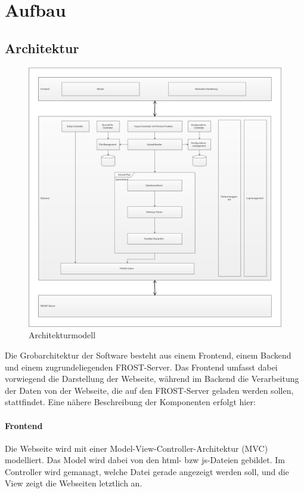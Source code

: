 \section{Aufbau}

\subsection{Architektur}
\begin{figure}[htbp]
\centering
\includegraphics[scale=0.44]{uml/architektur.eps}
\caption{\label{fig:architektur} Architekturmodell}
\end{figure}

Die Grobarchitektur der Software besteht aus einem Frontend, einem Backend und einem zugrundeliegenden FROST-Server. Das Frontend umfasst dabei vorwiegend die Darstellung der Webseite, während im Backend die Verarbeitung der Daten von der Webseite, die auf den FROST-Server geladen werden sollen, stattfindet. Eine nähere Beschreibung der Komponenten erfolgt hier:

\paragraph{Frontend}
Die Webseite wird mit einer Model-View-Controller-Architektur (MVC) modelliert.
Das Model wird dabei von den html- bzw js-Dateien gebildet.
Im Controller wird gemanagt, welche Datei gerade angezeigt werden soll, und die View zeigt die Webseiten letztlich an.

